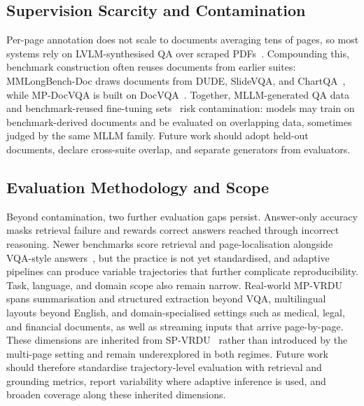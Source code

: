 \documentclass[11pt,twoside,openany]{report}
\begin{document}
\subsection{Supervision Scarcity and Contamination}
\label{sec:conc_supervision}

Per-page annotation does not scale to documents averaging tens of pages, so most systems rely on LVLM-synthesised QA over scraped PDFs~\citep{tanaka2024instructdoc,jain2025simpledoc,xiong2026docr1,zhang2026docdancer}. Compounding this, benchmark construction often reuses documents from earlier suites: MMLongBench-Doc draws documents from DUDE, SlideVQA, and ChartQA~\citep{ma2024mmlongbench}, while MP-DocVQA is built on DocVQA~\citep{tito2023hierarchical,mathew2021docvqa}. Together, MLLM-generated QA data~\citep{deng2025longdocurl} and benchmark-reused fine-tuning sets~\citep{xiong2026docr1,duan2025docopilot} risk contamination: models may train on benchmark-derived documents and be evaluated on overlapping data, sometimes judged by the same MLLM family. Future work should adopt held-out documents, declare cross-suite overlap, and separate generators from evaluators.

\subsection{Evaluation Methodology and Scope}
\label{sec:conc_evaluation}

Beyond contamination, two further evaluation gaps persist. Answer-only accuracy masks retrieval failure and rewards correct answers reached through incorrect reasoning. Newer benchmarks score retrieval and page-localisation alongside VQA-style answers~\citep{hui2024uda,zhu2026doclens}, but the practice is not yet standardised, and adaptive pipelines can produce variable trajectories that further complicate reproducibility. Task, language, and domain scope also remain narrow. Real-world MP-VRDU spans summarisation and structured extraction beyond VQA, multilingual layouts beyond English, and domain-specialised settings such as medical, legal, and financial documents, as well as streaming inputs that arrive page-by-page. These dimensions are inherited from SP-VRDU~\citep{ding2026survey} rather than introduced by the multi-page setting and remain underexplored in both regimes. Future work should therefore standardise trajectory-level evaluation with retrieval and grounding metrics, report variability where adaptive inference is used, and broaden coverage along these inherited dimensions.
\end{document}
